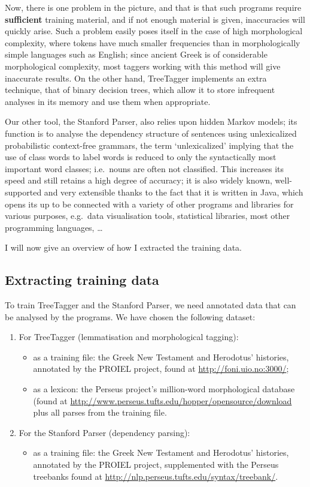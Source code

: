 Now, there is one problem in the picture, and that is that such programs
require \textbf{sufficient} training material, and if not enough material is
given, inaccuracies will quickly arise. Such a problem easily poses itself in
the case of high morphological complexity, where tokens have much smaller
frequencies than in morphologically simple languages such as English; since
ancient Greek is of considerable morphological complexity, most taggers working
with this method will give inaccurate results. On the other hand, TreeTagger
implements an extra technique, that of binary decision trees, which allow it to
store infrequent analyses in its memory and use them when appropriate.

Our other tool, the Stanford Parser, also relies upon hidden Markov models; its
function is to analyse the dependency structure of sentences using
unlexicalized probabilistic context-free grammars, the term `unlexicalized'
implying that the use of class words to label words is reduced to only the
syntactically most important word classes; i.e.\ nouns are often not
classified.  This increases its speed and still retains a high degree of
accuracy; it is also widely known, well-supported and very extensible thanks to
the fact that it is written in Java, which opens its up to be connected with a
variety of other programs and libraries for various purposes, e.g.\ data
visualisation tools, statistical libraries, most other programming languages,
\ldots

I will now give an overview of how I extracted the training data.

\subsection{Extracting training data} %
\label{sub:extract_training_data}
To train TreeTagger and the Stanford Parser, we need annotated data that can be analysed by the programs. We have chosen the following dataset:

\begin{enumerate}
  \item For TreeTagger (lemmatisation and morphological tagging):
\begin{itemize}
  \item as a training file: the Greek New Testament and Herodotus' histories, annotated by the PROIEL project, found at \url{http://foni.uio.no:3000/};
  \item as a lexicon: the Perseus project's million-word morphological database (found at \url{http://www.perseus.tufts.edu/hopper/opensource/download} plus all parses from the training file.
\end{itemize}

\item For the Stanford Parser (dependency parsing):
\begin{itemize}
  \item as a training file: the Greek New Testament and Herodotus' histories, annotated by the PROIEL project, supplemented with the Perseus treebanks found at \url{http://nlp.perseus.tufts.edu/syntax/treebank/}.
\end{itemize}
\end{enumerate}

